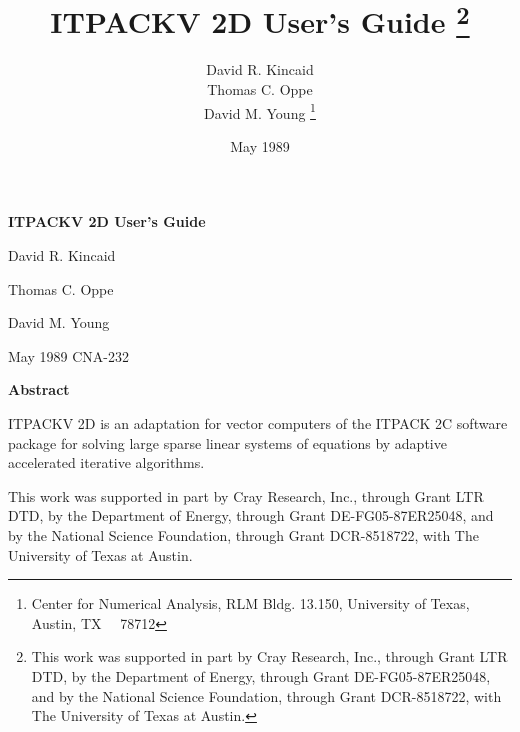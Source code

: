 
\def \la{\langle}
\def \ra{\rangle}
\def \lp{\left(}
\def \rp{\right)}
\def \lb{\left[}
\def \rb{\right]}
\def \lc{\left\{}
\def \rc{\right\}}
\def \om{\omega}
\def \ha{\frac{1}{2}}

\evensidemargin 0.5in
\oddsidemargin 0.5in
\textwidth 5.5in



\thispagestyle{empty}
\vspace*{0.6in}
\centerline{\Large\bf ITPACKV 2D User's Guide}
\vspace*{0.25in}
\centerline{David R. Kincaid}
\centerline{Thomas C. Oppe}
\centerline{David M. Young}
\vspace*{0.3in}
\centerline{May 1989 \hspace*{1.4in} CNA-232}
\vspace*{2.1in}
\centerline{\bf Abstract}
\vspace*{0.2in}
\noindent
ITPACKV 2D is an adaptation for vector computers of the ITPACK 2C
software package for solving large sparse linear systems of equations by
adaptive accelerated iterative algorithms.

\vspace*{1.5in}
\noindent
This work was supported in part by Cray Research, Inc., through 
Grant LTR DTD, by the Department of Energy, through Grant 
DE-FG05-87ER25048, and by the National Science Foundation, through 
Grant DCR-8518722, with The University of Texas at Austin.

\newpage
\setcounter{page}{1}

\title{ITPACKV 2D User's Guide
 \thanks{This work was supported in part by Cray Research, Inc., 
         through Grant LTR DTD, by the Department of Energy, through 
         Grant DE-FG05-87ER25048, and by the National Science 
         Foundation, through Grant DCR-8518722, with The University 
         of Texas at Austin. } }

\author{David R. Kincaid \\
        Thomas C. Oppe \\
        David M. Young 
        \thanks{Center for Numerical Analysis, RLM Bldg. 13.150, 
                University of Texas, Austin, TX \ \ 78712} }

\date{May 1989}

\maketitle

